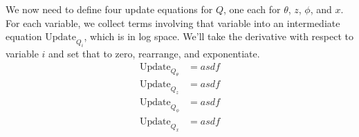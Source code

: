 \documentclass[12pt]{article}
\begin{document}
We now need to define four update equations for $Q$, one each for $\theta$, $z$, $\phi$, and $x$.  For each variable, we collect terms involving that variable into an intermediate equation $\mathrm{Update}_{Q_i}$, which is in log space.  We'll take the derivative with respect to variable $i$ and set that to zero, rearrange, and exponentiate.
\begin{align*}
\mathrm{Update}_{Q_\theta} &= asdf \\ 
\mathrm{Update}_{Q_z} &= asdf \\
\mathrm{Update}_{Q_\phi} &= asdf \\
\mathrm{Update}_{Q_x} &= asdf 
\end{align*}



\end{document}
